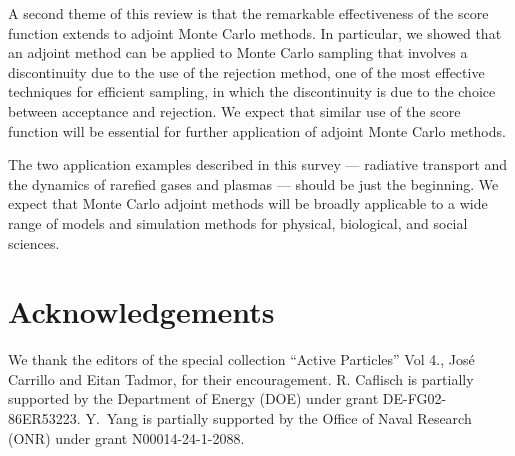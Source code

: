 \documentclass[12pt]{amsart}
\begin{document}
A second theme of this review is that the remarkable effectiveness of the score function extends to adjoint Monte Carlo methods. In particular, we showed that an adjoint method can be applied to Monte Carlo sampling that involves a discontinuity due to the use of the rejection method, one of the most effective techniques for efficient sampling, in which the discontinuity is due to the choice between acceptance and rejection. We expect that similar use of the score function will be essential for further application of adjoint Monte Carlo methods.


The two application examples described in this survey --- radiative transport and the dynamics of rarefied gases and plasmas --- should be just the beginning. We expect that Monte Carlo adjoint methods will be broadly applicable to a wide range of models and simulation methods for physical, biological, and social sciences. 



 
\section*{Acknowledgements}
We thank the editors of the special collection  ``Active Particles'' Vol 4., Jos\'e Carrillo and Eitan Tadmor, for their encouragement. R. Caflisch is partially supported by the Department of Energy (DOE) under grant DE-FG02-86ER53223. Y.~Yang is partially supported by the Office of Naval Research (ONR) under grant N00014-24-1-2088. 
\end{document}
